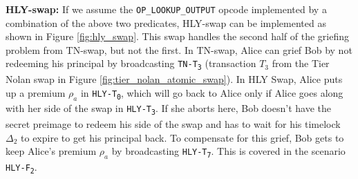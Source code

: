 \bigskip
\noindent
\textbf{HLY-swap:}
If we assume the \texttt{OP\_LOOKUP\_OUTPUT} opcode implemented by a combination of the above two predicates, HLY-swap can be implemented as shown in Figure \ref{fig:hly_swap}. This swap handles the second half of the griefing problem from TN-swap, but not the first. In TN-swap, Alice can grief Bob by not redeeming his principal by broadcasting \texttt{TN-T\textsubscript{3}} (transaction $T_3$ from the Tier Nolan swap in Figure \ref{fig:tier_nolan_atomic_swap}). In HLY Swap, Alice puts up a premium $\rho_a$ in \texttt{HLY-T\textsubscript{0}}, which will go back to Alice only if Alice goes along with her side of the swap in \texttt{HLY-T\textsubscript{3}}. If she aborts here, Bob doesn't have the secret preimage to redeem his side of the swap and has to wait for his timelock $\Delta_2$ to expire to get his principal back. To compensate for this grief, Bob gets to keep Alice's premium $\rho_a$ by broadcasting \texttt{HLY-T\textsubscript{7}}. This is covered in the scenario \texttt{HLY-F\textsubscript{2}}. 

